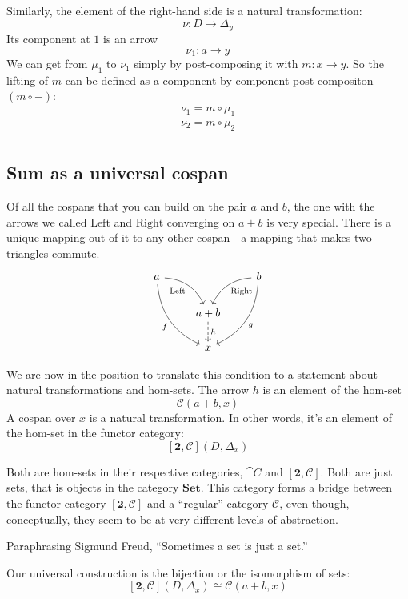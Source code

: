 \documentclass[DaoFP]{subfiles}
\begin{document}
Similarly, the element of the right-hand side is a natural transformation:
\[ \nu \colon D \to \Delta_{y} \]
Its component at $1$ is an arrow
\[ \nu_1 \colon a \to y \]
We can get from $\mu_1$ to $\nu_1$ simply by post-composing it with $m \colon x \to y$. So the lifting of $m$ can be defined as a component-by-component post-compositon $(m \circ -)$:
\begin{align*}
\nu_1 = m \circ \mu_1 \\
\nu_2 = m \circ \mu_2 \\
\end{align*}

\subsection{Sum as a universal cospan}

Of all the cospans that you can build on the pair $a$ and $b$, the one with the arrows we called $\text{Left}$ and $\text{Right}$ converging on $a + b$  is very special. There is a unique mapping out of it to any other cospan---a mapping that makes two triangles commute.  
\[
 \begin{tikzcd}
 a
 \arrow[dr,  bend left, "\text{Left}"']
 \arrow[ddr, bend right, "f"']
 && b
 \arrow[dl, bend right, "\text{Right}"]
 \arrow[ddl, bend left, "g"]
 \\
&a + b
\arrow[d, dashed, "h"]
\\
& x
 \end{tikzcd}
\]

We are now in the position to translate this condition to a statement about natural transformations and hom-sets. The arrow $h$ is an element of the hom-set 
\[ \mathcal{C}(a + b, x)\]
A cospan over $x$ is a natural transformation. In other words, it's an element of the hom-set in the functor category:
\[ [\mathbf{2}, \mathcal{C}](D, \Delta_x) \]

Both are hom-sets in their respective categories, $\cat C$ and $[\mathbf{2}, \mathcal{C}]$. Both are just sets, that is objects in the category $\mathbf{Set}$. This category forms a bridge between the functor category $[\mathbf{2}, \mathcal{C}]$ and a ``regular'' category $\mathcal{C}$, even though, conceptually, they seem to be at very different levels of abstraction. 

Paraphrasing Sigmund Freud, ``Sometimes a set is just a set.''

Our universal construction is the bijection or the isomorphism of sets:
\[ [\mathbf{2}, \mathcal{C}](D, \Delta_x)  \cong \mathcal{C}(a + b, x) \]
\end{document}
